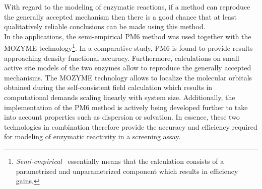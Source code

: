 With regard to the modeling of enzymatic reactions, if a method can reproduce the generally accepted mechanism then there is a good chance that at least qualitatively reliable conclusions can be made using this method.\\
In the applications, the semi-empirical PM6 method\cite{stewart2007optimization, stewart2009application} was used together with the MOZYME technology\cite{stewart1996application}\footnote{\textit{Semi-empirical } essentially means that the calculation consists of a parametrized and unparametrized component which results in efficiency gains.}.
In a comparative study, PM6 is found to provide results approaching density functional accuracy\cite{schenker2011assessment}.
Furthermore, calculations on small active site models of the two enzymes allow to reproduce the generally accepted mechanisms.
The MOZYME technology allows to localize the molecular orbitals obtained during the self-consistent field calculation which results in computational demands scaling linearly with system size.
Additionally, the implementation of the PM6 method is actively being developed further to take into account properties such as dispersion or solvation\cite{rezac2009semiempirical, vrezavc2011halogen}.
In essence, these two technologies in combination therefore provide the accuracy and efficiency required for modeling of enzymatic reactivity in a screening assay.

